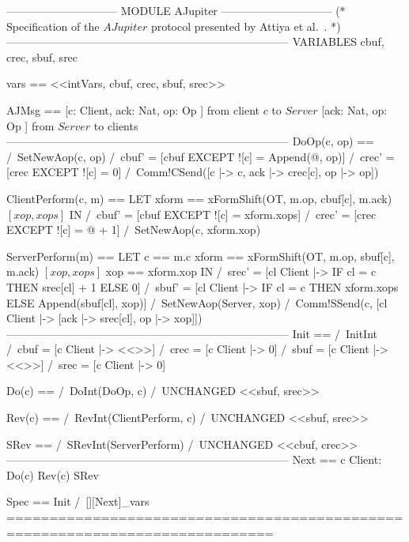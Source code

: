 \documentclass{article}
\begin{document}
\begin{tla}
------------------------------ MODULE AJupiter ------------------------------
(* 
Specification of the $AJupiter$ protocol presented by Attiya et al.~\cite{Attiya:TR17}.
*)
-----------------------------------------------------------------------------
VARIABLES cbuf, crec, sbuf, srec

vars == <<intVars, cbuf, crec, sbuf, srec>>

AJMsg == [c: Client, ack: Nat, op: Op ] \cup \* from client $c$ to $Server$ 
         [ack: Nat, op: Op ] \* from $Server$ to clients
-----------------------------------------------------------------------------
DoOp(c, op) == 
    /\ SetNewAop(c, op)
    /\ cbuf' = [cbuf EXCEPT ![c] = Append(@, op)]
    /\ crec' = [crec EXCEPT ![c] = 0]
    /\ Comm!CSend([c |-> c, ack |-> crec[c], op |-> op])

ClientPerform(c, m) == 
    LET xform == xFormShift(OT, m.op, cbuf[c], m.ack) \* $[xop, xops]$
    IN  /\ cbuf' = [cbuf EXCEPT ![c] = xform.xops]
        /\ crec' = [crec EXCEPT ![c] = @ + 1]
        /\ SetNewAop(c, xform.xop)

ServerPerform(m) == 
    LET     c == m.c             
        xform == xFormShift(OT, m.op, sbuf[c], m.ack) \* $[xop, xops]$
          xop == xform.xop
    IN  /\ srec' = [cl \in Client |-> IF cl = c THEN srec[cl] + 1 ELSE 0] 
        /\ sbuf' = [cl \in Client |-> IF cl = c THEN xform.xops 
                                                ELSE Append(sbuf[cl], xop)] 
        /\ SetNewAop(Server, xop)
        /\ Comm!SSend(c, [cl \in Client |-> [ack |-> srec[cl], op |-> xop]])
-----------------------------------------------------------------------------
Init == 
    /\ InitInt
    /\ cbuf = [c \in Client |-> <<>>]
    /\ crec = [c \in Client |-> 0]
    /\ sbuf = [c \in Client |-> <<>>]
    /\ srec = [c \in Client |-> 0]

Do(c) == 
    /\ DoInt(DoOp, c)
    /\ UNCHANGED <<sbuf, srec>>

Rev(c) == 
    /\ RevInt(ClientPerform, c)
    /\ UNCHANGED <<sbuf, srec>>

SRev == 
    /\ SRevInt(ServerPerform)
    /\ UNCHANGED <<cbuf, crec>>
-----------------------------------------------------------------------------
Next == 
    \/ \E c \in Client: Do(c) \/ Rev(c)
    \/ SRev

Spec == Init /\ [][Next]_vars
=============================================================================
\end{tla}
\end{document}
